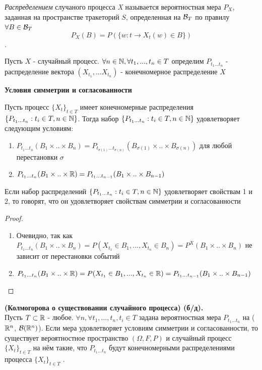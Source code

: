 \begin{definition}\textit{Распределением} случаного процесса \textit{X} называется вероятностная мера $P_{X}$, заданная на пространстве тракеторий $S$, определенная на $\mathcal{B}_{T}$
по правилу $\forall B \in \mathcal{B}_{T}$ $$ P_{X}(B) = P(\{w : t \rightarrow X_{t}(w) \in B \})$$ .
\end{definition}

\begin{definition}
Пусть $X$ - случайный процесс. $\forall n \in \mathbb{N}, \forall t_1, ..., t_n \in T$ определим $P_{t_1...t_n}$ - распределение вектора $(X_{t_1}, ... X_{t_n})$ - конечномерное распределение $X$ 
\end{definition}
\textbf{Условия симметрии и согласованности}
\begin{lemma}
Пусть процесс $\{X_t\}_{t \in T}$ имеет конечномерные распределения $\{P_{t_1...t_n}: t_i \in T, n\in \mathbb{N}\}$. Тогда набор $\{P_{t_1...t_n}: t_i \in T, n\in \mathbb{N}\}$ удовлетворяет следующим условиям: \begin{enumerate}
    \item $P_{t_1...t_n}(B_1 \times .. \times B_n) = P_{t_{\sigma(1)}...t_{\sigma(n)}}(B_{\sigma(1)} \times .. \times B_{\sigma(n)})$ для любой перестановки $\sigma$ 
    \item  $P_{t_1...t_n}(B_1 \times .. \times \mathbb{R}) = P_{t_1...t_{n-1}}(B_1 \times .. \times B_{n-1})$
\end{enumerate}
\begin{note}
    Если набор распределений $\{P_{t_1...t_n}: t_i \in T, n\in \mathbb{N}\}$ удовлетворяет свойствам 1 и 2, то говорят, что он удовлетворяет свойствам симметрии и согласованности
\end{note}
\end{lemma}
\begin{proof}
\begin{enumerate}
    \item Очевидно, так как $P_{t_1...t_n}(B_1 \times .. \times B_n) = P(X_{t_1} \in B_1, ..., X_{t_n} \in B_n) = P^{X}(B_1 \times .. \times B_n)$ 
не зависит от перестановки событий
\item $P_{t_1...t_n}(B_1 \times .. \times \mathbb{R}) = P(X_{t_1} \in B_1, ..., X_{t_n} \in \mathbb{R}) = P_{t_1...t_{n-1}}(B_1 \times .. \times B_{n-1})$ 
\end{enumerate}
\end{proof}
\begin{theorem} \textbf{(Колмогорова о существовании случайного процесса) (б/д).} \\
Пусть $T \subset \mathbb{R}$ - любое.  $ \forall n, \forall t_1, ...,  t_n, t_i \in T $ задана вероятностная мера $P_{t_1...t_n}$ на ($\mathbb{R}^n$, $\mathcal{B}(\mathbb{R}^n)$).
Если мера удовлетворяет условиям симметрии и согласованности, то существует вероятностное пространство $(\Omega, F, P)$ и случайный процесс $\{X_t\}_{t \in T}$ на нём такие, что  $P_{t_1...t_n}$ будут конечномерными распределениями процесса $\{X_t\}_{t \in T}$ .
\end{theorem}

